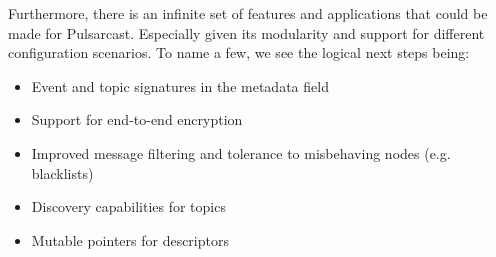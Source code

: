 Furthermore, there is an infinite set of features and applications that could
be made for Pulsarcast. Especially given its modularity and support for
different configuration scenarios. To name a few, we see the logical next steps
being:

\begin{itemize}
  \item Event and topic signatures in the metadata field
  \item Support for end-to-end encryption
  \item Improved message filtering and tolerance to misbehaving nodes (e.g. blacklists)
  \item Discovery capabilities for topics
  \item Mutable pointers for descriptors
\end{itemize}
